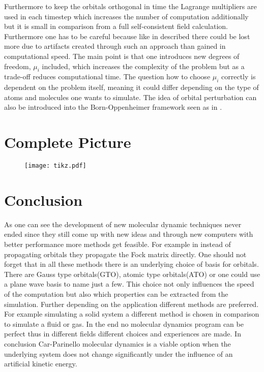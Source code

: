 \documentclass[12pt]{scrartcl}
\begin{document}
Furthermore to keep the orbitals orthogonal in time the Lagrange multipliers are used in each timestep which increases the number of computation additionally but it is small in comparison from a full self-consistent field calculation. Furthermore one has to be careful because like in \cite{tangney2006theory} described there could be lost more due to artifacts created through such an approach than gained in computational speed. The main point is that one introduces new degrees of freedom, $\mu_i$ included, which increases the complexity of the problem but as a trade-off reduces computational time. The question how to choose $\mu_i$ correctly is dependent on the problem itself, meaning it could differ depending on the type of atoms and molecules one wants to simulate. The idea of orbital perturbation can also be introduced into the Born-Oppenheimer framework seen as in \cite{niklasson2009extended}.

\section{Complete Picture}
\newpage
\begin{landscape}
\begin{figure}
\texttt{[image: tikz.pdf]}
\end{figure}
%
\end{landscape}
\newpage

\section{Conclusion}
As one can see the development of new molecular dynamic techniques never ended since they still come up with new ideas and through new computers with better performance more methods get feasible. For example in \cite{pulay2004fock} instead of propagating orbitals they propagate the Fock matrix directly. One should not forget that in all these methods there is an underlying choice of basis for orbitals. There are Gauss type orbitals(GTO), atomic type orbitals(ATO) or one could use a plane wave basis to name just a few. This choice not only influences the speed of the computation but also which properties can be extracted from the simulation. Further depending on the application different methods are preferred. For example simulating a solid system a different method is chosen in comparison to simulate a fluid or gas. In the end no molecular dynamics program can be perfect thus in different fields different choices and experiences are made. In conclusion Car-Parinello molecular dynamics is a viable option when the underlying system does not change significantly under the influence of an artificial kinetic energy.

\nocite{marx2009ab} %
\nocite{payne1992iterative} %
\nocite{pulay2004fock} %
\nocite{fischer1987general} %

\newpage


\end{document}
